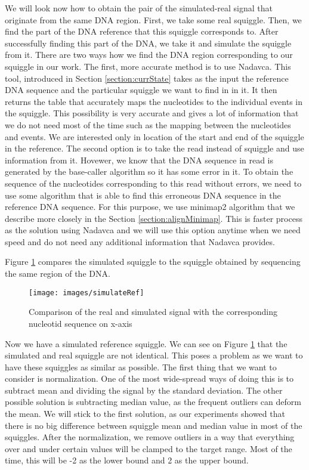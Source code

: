 We will look now how to obtain the pair of the simulated-real signal that originate
from the same DNA region. First, we take some real squiggle.
Then, we find the part of the DNA reference that this squiggle corresponds to. After
successfully finding this part of the DNA, we take it and simulate the squiggle from it. There are two
ways how we find the DNA region corresponding to our squiggle in our work. The first, more accurate method is to
use Nadavca. This tool, introduced in Section \ref{section:currState} takes
as the input the reference DNA sequence and the particular squiggle we want to find in
in it. It then returns the table that accurately maps the nucleotides to the individual
events in the squiggle. This possibility is very accurate and gives a lot of information
that we do not need most of the time such as the mapping between the nucleotides
and events. We are interested only in location of the start and end of the squiggle
in the reference. The second option is to take the read instead of squiggle and use information from it.
Hovewer, we know that the DNA sequence in read is generated by the base-caller algorithm so it has some error
in it. To obtain the sequence of the nucleotides corresponding to this read without
errors, we need to use some algorithm that is able to find this erroneous DNA
sequence in the reference DNA sequence. For this purpose, we use minimap2 algorithm
that we describe more closely in the Section \ref{section:alignMinimap}. This is faster
process as the solution using Nadavca and we will use this option anytime when we need
speed and do not need any additional information that Nadavca provides.

Figure \ref{obr:simVsReal} compares the simulated squiggle to the squiggle obtained
by sequencing the same region of the DNA.

\begin{figure}
\centerline{\texttt{[image: images/simulateRef]}}
\caption[TODO]{Comparison of the real and simulated signal with the corresponding nucleotid sequence on x-axis}
\label{obr:simVsReal}
\end{figure}

Now we have a simulated reference squiggle. We can see on Figure \ref{obr:simVsReal} that the simulated and real
squiggle are not identical. This poses a problem as we want to have these squiggles as
similar as possible. The first thing that we want to consider is normalization.
One of the most wide-spread ways of doing this is to subtract mean and dividing
the signal by the standard deviation. The other possible solution is subtracting median value,
as the frequent outliers can deform the mean. We will stick to the first solution,
as our experiments showed that there is no big difference between squiggle mean
and median value in most of the squiggles.
After the normalization, we remove outliers in a way that everything over and under certain values will
be clamped to the target range. Most of the time, this will be -2 as the lower bound
and 2 as the upper bound.

